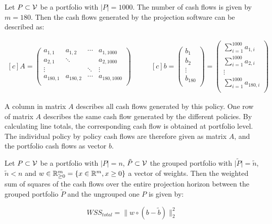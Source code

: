 \begin{example}
	Let $P \subset \mathcal{V}$ be a portfolio with $\vert P \vert = 1000$. The number of cash flows is given by $m = 180$. Then the cash flows generated by the projection software can be described as:
	
	\begin{equation*}
	\begin{aligned}[c]	
		A= 
		\left( 
			\begin{array}{cccc}
				a_{1,1} 	& a_{1,2} 	& \cdots 	& a_{1,1000} \\
				a_{2,1} 	& \ddots	&  			& a_{2,1000} \\
				\vdots 		&  			& \ddots 	& \vdots \\
				a_{180,1} 	& a_{180,2}	& \cdots 	& a_{180,1000} \\
			\end{array}
		\right)	
	\end{aligned}
	\qquad
	\begin{aligned}[c]
		b = 
		\left( 
			\begin{array}{c}
			b_{1} \\
			b_{2}\\
			\vdots\\
			b_{180}\\
			\end{array}
		\right)	
		=
		\left( 
			\begin{array}{c}
			\sum_{i = 1}^{1000} a_{1,i} \\
			\sum_{i = 1}^{1000} a_{2,i}\\
			\vdots\\
			\sum_{i = 1}^{1000} a_{180,i}\\
			\end{array}
		\right)	
	\end{aligned}	
	\end{equation*}
\end{example}

A column in matrix $A$ describes all cash flows generated by this policy. One row of matrix $A$ describes the same cash flow generated by the different policies. By calculating line totals, the corresponding cash flow is obtained at portfolio level. The individual policy by policy cash flows are therefore given as matrix $A$, and the portfolio cash flows as vector $b$. 

\begin{definition}
	Let $P \subset \mathcal{V}$ be a portfolio with $\vert P \vert = n$, $\tilde{P} \subset \mathcal{V}$  the grouped portfolio with $\vert \tilde{P} \vert = \tilde{n}$, $\tilde{n} < n$ and $w \in \mathbb{R}^m_{\geq 0} = \{x \in \mathbb{R}^m, x \geq 0\}$ a vector of weights. Then the weighted sum of squares of the cash flows over the entire projection horizon between the grouped portfolio $\tilde{P}$ and the ungrouped one $P$ is given by: 
	
	\begin{equation}\label{eq:objective_function}
		WSS_{total} = \lVert w \circ (b - \tilde{b})\lVert_2^2
	\end{equation}
\end{definition}

